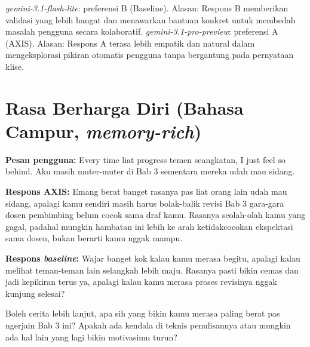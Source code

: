 \textit{gemini-3.1-flash-lite}: preferensi B (Baseline). Alasan: Respons B memberikan validasi yang lebih hangat dan menawarkan bantuan konkret untuk membedah masalah pengguna secara kolaboratif.\newline
\textit{gemini-3.1-pro-preview}: preferensi A (AXIS). Alasan: Respons A terasa lebih empatik dan natural dalam mengeksplorasi pikiran otomatis pengguna tanpa bergantung pada pernyataan klise.\newline

\section{Rasa Berharga Diri (Bahasa Campur, \textit{memory-rich})}

\textbf{Pesan pengguna:} Every time liat progress temen seangkatan, I just feel so behind. Aku masih muter-muter di Bab 3 sementara mereka udah mau sidang.

\textbf{Respons AXIS:} Emang berat banget rasanya pas liat orang lain udah mau sidang, apalagi kamu sendiri masih harus bolak-balik revisi Bab 3 gara-gara dosen pembimbing belum cocok sama draf kamu. Rasanya seolah-olah kamu yang gagal, padahal mungkin hambatan ini lebih ke arah ketidakcocokan ekspektasi sama dosen, bukan berarti kamu nggak mampu.

\textbf{Respons \textit{baseline}:} Wajar banget kok kalau kamu merasa begitu, apalagi kalau melihat teman-teman lain selangkah lebih maju. Rasanya pasti bikin cemas dan jadi kepikiran terus ya, apalagi kalau kamu merasa proses revisinya nggak kunjung selesai?

Boleh cerita lebih lanjut, apa sih yang bikin kamu merasa paling berat pas ngerjain Bab 3 ini? Apakah ada kendala di teknis penulisannya atau mungkin ada hal lain yang lagi bikin motivasimu turun?


